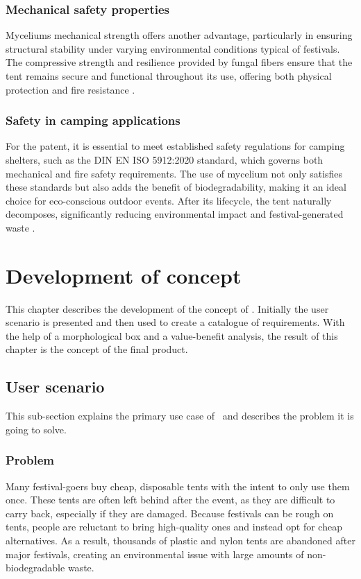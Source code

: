 \documentclass{article}
\begin{document}
\subsubsection{Mechanical safety properties}
Myceliums mechanical strength offers another advantage, particularly in ensuring
structural stability under varying environmental conditions typical of festivals. The
compressive strength and resilience provided by fungal fibers ensure that the tent remains
secure and functional throughout its use, offering both physical protection and fire
resistance \parencite{polym16020262}.

\subsubsection{Safety in camping applications}
For the patent, it is essential to meet established safety regulations for camping
shelters, such as the DIN EN ISO 5912:2020 standard, which governs both mechanical and
fire safety requirements. The use of mycelium not only satisfies these standards but also
adds the benefit of biodegradability, making it an ideal choice for eco-conscious outdoor
events. After its lifecycle, the tent naturally decomposes, significantly reducing
environmental impact and festival-generated waste \parencite{din2020}.

\newpage
\section{Development of concept}
This chapter describes the development of the concept of \myc.
Initially the user scenario is presented and then used to create a catalogue of
requirements. With the help of a morphological box and a value-benefit analysis, the
result of this chapter is the concept of the final product.

\subsection{User scenario}
This sub-section explains the primary use case of \myc\ and describes the problem it is
going to solve. 

\subsubsection{Problem}
Many festival-goers buy cheap, disposable tents with the intent to only use them once.
These tents are often left behind after the event, as they are difficult to carry back,
especially if they are damaged. Because festivals can be rough on tents, people are
reluctant to bring high-quality ones and instead opt for cheap alternatives. As a result,
thousands of plastic and nylon tents are abandoned after major festivals, creating an
environmental issue with large amounts of non-biodegradable waste.
\end{document}
